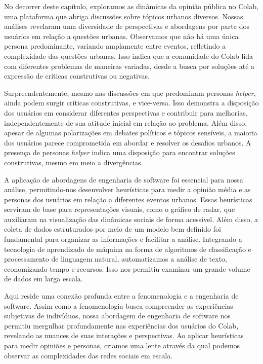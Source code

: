 No decorrer deste capítulo, exploramos as dinâmicas da opinião pública no Colab, uma plataforma que abriga discussões sobre tópicos urbanos diversos. Nossas análises revelaram uma diversidade de perspectivas e abordagens por parte dos usuários em relação a questões urbanas. Observamos que não há uma única persona predominante, variando amplamente entre eventos, refletindo a complexidade das questões urbanas. Isso indica que a comunidade do Colab lida com diferentes problemas de maneiras variadas, desde a busca por soluções até a expressão de críticas construtivas ou negativas.

Surpreendentemente, mesmo nas discussões em que predominam personas \textit{helper}, ainda podem surgir críticas construtivas, e vice-versa. Isso demonstra a disposição dos usuários em considerar diferentes perspectivas e contribuir para melhorias, independentemente de sua atitude inicial em relação ao problema. Além disso, apesar de algumas polarizações em debates políticos e tópicos sensíveis, a maioria dos usuários parece comprometida em abordar e resolver os desafios urbanos. A presença de personas \textit{helper} indica uma disposição para encontrar soluções construtivas, mesmo em meio a divergências.

A aplicação de abordagens de engenharia de software foi essencial para nossa análise, permitindo-nos desenvolver heurísticas para medir a opinião média e as personas dos usuários em relação a diferentes eventos urbanos. Essas heurísticas serviram de base para representações visuais, como o gráfico de radar, que auxiliaram na visualização das dinâmicas sociais de forma acessível. Além disso, a coleta de dados estruturados por meio de um modelo bem definido foi fundamental para organizar as informações e facilitar a análise. Integrando a tecnologia de aprendizado de máquina na forma de algoritmos de classificação e processamento de linguagem natural, automatizamos a análise de texto, economizando tempo e recursos. Isso nos permitiu examinar um grande volume de dados em larga escala.

Aqui reside uma conexão profunda entre a fenomenologia e a engenharia de software. Assim como a fenomenologia busca compreender as experiências subjetivas de indivíduos, nossa abordagem de engenharia de software nos permitiu mergulhar profundamente nas experiências dos usuários do Colab, revelando as nuances de suas interações e perspectivas. Ao aplicar heurísticas para medir opiniões e personas, criamos uma lente através da qual podemos observar as complexidades das redes sociais em escala.

